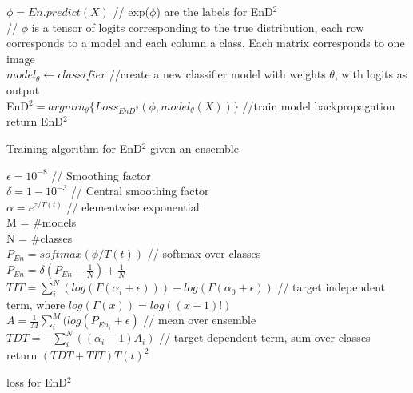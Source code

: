 \begin{algorithm}
  $\phi = En.predict(X)$ // exp($\phi$) are the labels for EnD$^2$  \\
  // $\phi$ is a tensor of logits corresponding to the true distribution, each row corresponds to a model and each column a class. Each matrix corresponds to one image \\
  $model_{\theta} \leftarrow classifier$ //create a new classifier model with weights $\theta$, with logits as output \\
  EnD$^2 = argmin_{\theta}\{Loss_{EnD^2}(\phi,model_{\theta}(X)) \}$ //train model backpropagation\\
  return EnD$^2$
  \caption{Training algorithm for EnD$^2$ given an ensemble}
  \label{alg:training}

\end{algorithm} 

\begin{algorithm}
  $\epsilon = 10^{-8}$  // Smoothing factor\\
  $\delta = 1-10^{-3}$ // Central smoothing factor\\

  $\alpha = e^{z/T(t)}$ // elementwise exponential\\
  M = \#models \\
  N = \#classes \\
  $P_{En} = softmax(\phi/T(t))$ // softmax over classes\\
  $P_{En} = \delta(P_{En} - \frac{1}{N}) + \frac{1}{N}$\\
  $TIT = \sum_i^N(log(\Gamma(\alpha_i + \epsilon))) - log(\Gamma(
          \alpha_0 + \epsilon))  $ // target independent term, where $log(\Gamma(x)) = log((x - 1)!)$\\
  $A = \frac{1}{M}\sum^{M}_i(log(P_{En_i} + \epsilon)$ // mean over ensemble\\
  $TDT = -\sum_i^{N}((\alpha_i - 1) A_i)$  // target dependent term, sum over classes \\

  return $(TDT +TIT) T(t)^2$


  \label{alg:loss}
  \caption{loss for EnD$^2$}


\end{algorithm} 



